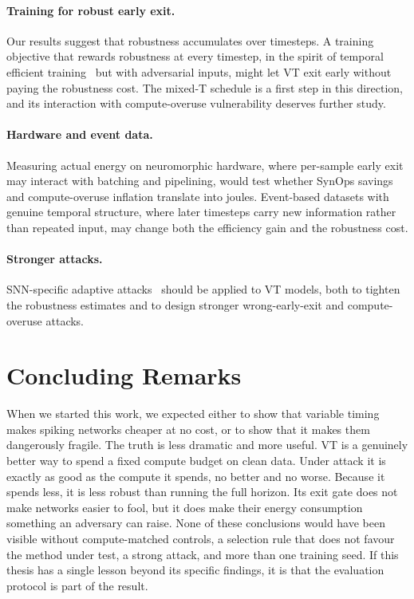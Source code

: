 \paragraph{Training for robust early exit.} Our results suggest that robustness accumulates over timesteps. A training objective that rewards robustness at every timestep, in the spirit of temporal efficient training~\cite{deng2022temporal} but with adversarial inputs, might let VT exit early without paying the robustness cost. The mixed-T schedule is a first step in this direction, and its interaction with compute-overuse vulnerability deserves further study.

\paragraph{Hardware and event data.} Measuring actual energy on neuromorphic hardware, where per-sample early exit may interact with batching and pipelining, would test whether SynOps savings and compute-overuse inflation translate into joules. Event-based datasets with genuine temporal structure, where later timesteps carry new information rather than repeated input, may change both the efficiency gain and the robustness cost.

\paragraph{Stronger attacks.} SNN-specific adaptive attacks~\cite{wang2026towards} should be applied to VT models, both to tighten the robustness estimates and to design stronger wrong-early-exit and compute-overuse attacks.

\section{Concluding Remarks}
\label{sec:con-remarks}

When we started this work, we expected either to show that variable timing makes spiking networks cheaper at no cost, or to show that it makes them dangerously fragile. The truth is less dramatic and more useful. VT is a genuinely better way to spend a fixed compute budget on clean data. Under attack it is exactly as good as the compute it spends, no better and no worse. Because it spends less, it is less robust than running the full horizon. Its exit gate does not make networks easier to fool, but it does make their energy consumption something an adversary can raise. None of these conclusions would have been visible without compute-matched controls, a selection rule that does not favour the method under test, a strong attack, and more than one training seed. If this thesis has a single lesson beyond its specific findings, it is that the evaluation protocol is part of the result.
